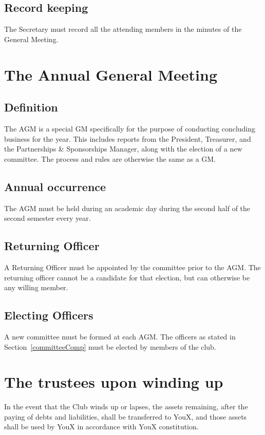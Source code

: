 \documentclass{constitution}
\begin{document}
\subsection{Record keeping}
The Secretary must record all the attending members in the minutes of the General Meeting.

\section{The Annual General Meeting}\label{annualGeneralMeeting}
\subsection{Definition}
The AGM is a special GM specifically for the purpose of conducting concluding business for the year. This includes reports from the President, Treasurer, and the Partnerships \& Sponsorships Manager, along with the election of a new committee. The process and rules are otherwise the same as a GM.

\subsection{Annual occurrence}
The AGM must be held during an academic day during the second half of the second semester every year.

\subsection{Returning Officer}
A Returning Officer must be appointed by the committee prior to the AGM. The returning officer cannot be a candidate for that election, but can otherwise be any willing member.

\subsection{Electing Officers}
A new committee must be formed at each AGM. The officers as stated in Section~\ref{committeeComp} must be elected by members of the club.

\section{The trustees upon winding up}
In the event that the Club winds up or lapses, the assets remaining, after the paying of debts and liabilities, shall be transferred to YouX, and those assets shall be used by YouX in accordance with YouX constitution.
\end{document}
